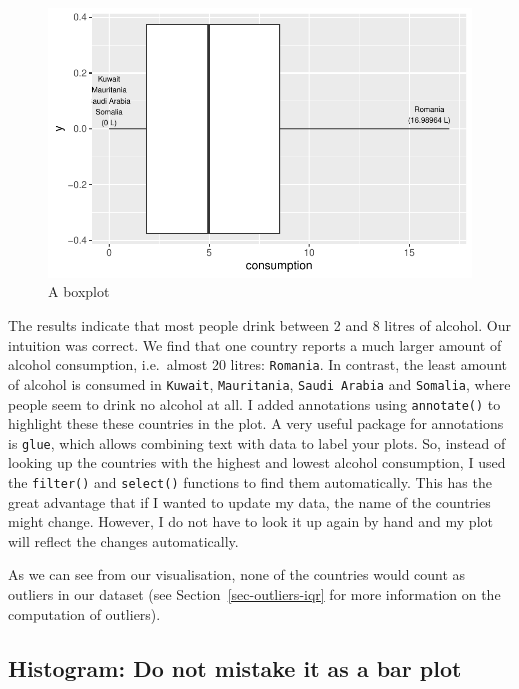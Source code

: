 \documentclass[
  letterpaper,
  DIV=11,
  numbers=noendperiod]{scrreprt}
\begin{document}
\begin{figure}[H]

{\centering \includegraphics{08_descriptive_statistics_files/figure-latex/a-boxplot-1.pdf}

}

\caption{A boxplot}

\end{figure}%

The results indicate that most people drink between 2 and 8 litres of
alcohol. Our intuition was correct. We find that one country reports a
much larger amount of alcohol consumption, i.e.~almost 20 litres:
\texttt{Romania}. In contrast, the least amount of alcohol is consumed
in \texttt{Kuwait}, \texttt{Mauritania}, \texttt{Saudi\ Arabia} and
\texttt{Somalia}, where people seem to drink no alcohol at all. I added
annotations using \texttt{annotate()} to highlight these these countries
in the plot. A very useful package for annotations is \texttt{glue},
which allows combining text with data to label your plots. So, instead
of looking up the countries with the highest and lowest alcohol
consumption, I used the \texttt{filter()} and \texttt{select()}
functions to find them automatically. This has the great advantage that
if I wanted to update my data, the name of the countries might change.
However, I do not have to look it up again by hand and my plot will
reflect the changes automatically.

As we can see from our visualisation, none of the countries would count
as outliers in our dataset (see Section~\ref{sec-outliers-iqr} for more
information on the computation of outliers).

\subsection{Histogram: Do not mistake it as a bar
plot}\label{sec-histograms}
\end{document}
